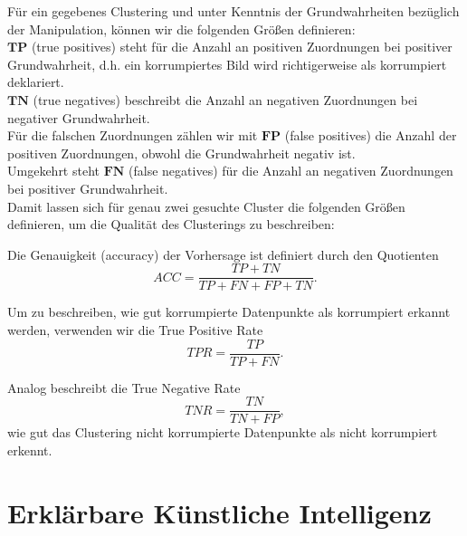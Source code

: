 \documentclass[twoside, 12pt,a4paper]{book}
\numberwithin{equation}{section}
\begin{document}
	\noindent Für ein gegebenes Clustering und unter Kenntnis der Grundwahrheiten bezüglich der Manipulation, können wir die folgenden Größen definieren:\\
	
	\noindent $\boldsymbol{TP}$ (true positives) steht für die Anzahl an positiven Zuordnungen bei positiver Grundwahrheit, d.h. ein korrumpiertes Bild wird richtigerweise als korrumpiert deklariert.\\
	
	\noindent $\boldsymbol{TN}$ (true negatives) beschreibt die Anzahl an negativen Zuordnungen bei negativer Grundwahrheit.\\

	\noindent Für die falschen Zuordnungen zählen wir mit $\boldsymbol{FP}$ (false positives) die Anzahl der positiven Zuordnungen, obwohl die Grundwahrheit negativ ist.\\
	
	\noindent Umgekehrt steht $\boldsymbol{FN}$ (false negatives) für die Anzahl an negativen Zuordnungen bei positiver Grundwahrheit.\\
	 
	\noindent Damit lassen sich für genau zwei gesuchte Cluster die folgenden Größen definieren, um die Qualität des Clusterings zu beschreiben:
	
	\noindent Die Genauigkeit (accuracy) der Vorhersage ist definiert durch den Quotienten \begin{equation}
		ACC = \frac{TP +TN}{TP + FN + FP +TN}.
	\end{equation} 
	
	\noindent Um zu beschreiben, wie gut korrumpierte Datenpunkte als korrumpiert erkannt werden, verwenden wir die True Positive Rate 
	\begin{equation}
		TPR = \frac{TP}{TP + FN}.
	\end{equation}
	
	\noindent Analog beschreibt die True Negative Rate 
	\begin{equation}
		TNR = \frac{TN}{TN +FP},
	\end{equation} wie gut das Clustering nicht korrumpierte Datenpunkte als nicht korrumpiert erkennt.
	
	


	
	
	\section{Erklärbare Künstliche Intelligenz}
	\label{chapter_xai}
	
\end{document}
